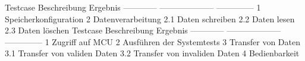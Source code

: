 {}\markdownRendererInterblockSeparator
{}\markdownRendererPipe{} Testcase \markdownRendererPipe{} Beschreibung \markdownRendererPipe{} Ergebnis \markdownRendererPipe{} \markdownRendererPipe{} ------------ \markdownRendererPipe{} -------------------- \markdownRendererPipe{} --------------\markdownRendererPipe{} \markdownRendererPipe{} 1 \markdownRendererPipe{} Speicherkonfiguration \markdownRendererPipe{} \markdownRendererPipe{} \markdownRendererPipe{} 2 \markdownRendererPipe{} Datenverarbeitung \markdownRendererPipe{} \markdownRendererPipe{} \markdownRendererPipe{} 2.1 \markdownRendererPipe{} Daten schreiben \markdownRendererPipe{} \markdownRendererPipe{} \markdownRendererPipe{} 2.2 \markdownRendererPipe{} Daten lesen \markdownRendererPipe{} \markdownRendererPipe{} \markdownRendererPipe{} 2.3 \markdownRendererPipe{} Daten löschen \markdownRendererPipe{} \markdownRendererPipe{}\markdownRendererInterblockSeparator
{}\markdownRendererInterblockSeparator
{}\markdownRendererPipe{} Testcase \markdownRendererPipe{} Beschreibung \markdownRendererPipe{} Ergebnis \markdownRendererPipe{} \markdownRendererPipe{} ------------ \markdownRendererPipe{} -------------------- \markdownRendererPipe{} --------------\markdownRendererPipe{} \markdownRendererPipe{} 1 \markdownRendererPipe{} Zugriff auf MCU \markdownRendererPipe{} \markdownRendererPipe{} \markdownRendererPipe{} 2 \markdownRendererPipe{} Ausführen der Systemtests \markdownRendererPipe{} \markdownRendererPipe{} \markdownRendererPipe{} 3 \markdownRendererPipe{} Transfer von Daten \markdownRendererPipe{} \markdownRendererPipe{} \markdownRendererPipe{} 3.1 \markdownRendererPipe{} Transfer von validen Daten \markdownRendererPipe{} \markdownRendererPipe{} \markdownRendererPipe{} 3.2 \markdownRendererPipe{} Transfer von invaliden Daten \markdownRendererPipe{} \markdownRendererPipe{} \markdownRendererPipe{} 4 \markdownRendererPipe{} Bedienbarkeit \markdownRendererPipe{} \markdownRendererPipe{}\relax